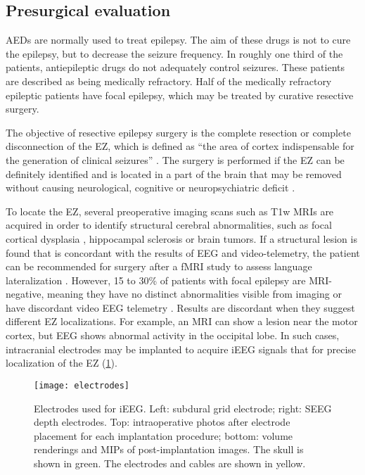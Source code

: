 \subsection{Presurgical evaluation}

\Acp{AED} are normally used to treat epilepsy.
The aim of these drugs is not to cure the epilepsy, but to decrease the seizure frequency.
In roughly one third of the patients, antiepileptic drugs do not adequately control seizures.
These patients are described as being medically refractory.
Half of the medically refractory epileptic patients have focal epilepsy, which may be treated by curative resective surgery.

The objective of resective epilepsy surgery is the complete resection or complete disconnection of the \ac{EZ}, which is defined as ``the area of cortex indispensable for the generation of clinical seizures'' \cite{rosenow_presurgical_2001}.
The surgery is performed if the \ac{EZ} can be definitely identified and is located in a part of the brain that may be removed without causing neurological, cognitive or neuropsychiatric deficit \cite{jobst_resective_2015}.

To locate the \ac{EZ}, several preoperative imaging scans such as \ac{T1w} \acp{MRI} are acquired in order to identify structural cerebral abnormalities, such as focal cortical dysplasia \cite{kabat_focal_2012}, hippocampal sclerosis \cite{thom_review_2014} or brain tumors.
If a structural lesion is found that is concordant with the results of \ac{EEG} and video-telemetry, the patient can be recommended for surgery after a \ac{fMRI} study to assess language lateralization \cite{duncan_brain_2016}.
However, 15 to 30\% of patients with focal epilepsy are \ac{MRI}-negative, meaning they have no distinct abnormalities visible from imaging or have discordant video \ac{EEG} telemetry \cite{bien_characteristics_2009}.
Results are discordant when they suggest different \ac{EZ} localizations.
For example, an \ac{MRI} can show a lesion near the motor cortex, but \ac{EEG} shows abnormal activity in the occipital lobe.
In such cases, intracranial electrodes may be implanted to acquire \ac{iEEG} signals that for precise localization of the \ac{EZ} (\cref{fig:electrodes}).

\begin{figure}[hbt!]
  \centering
  \texttt{[image: electrodes]}
  \caption[Electrodes used for intracranial EEG]{
    Electrodes used for \ac{iEEG}.
    Left: subdural grid electrode;
    right: \ac{SEEG} depth electrodes.
    Top: intraoperative photos after electrode placement for each implantation procedure;
    bottom: volume renderings and \acp{MIP} of post-implantation images.
    The skull is shown in green.
    The electrodes and cables are shown in yellow.
  }\label{fig:electrodes}
\end{figure}


